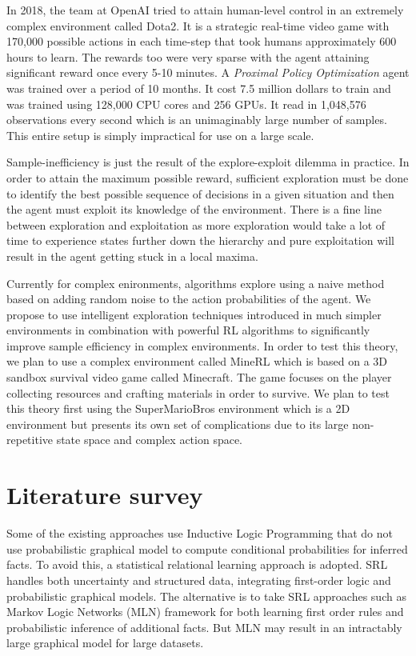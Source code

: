\documentclass[12pt,a4paper]{article}
\begin{document}
In 2018, the team at OpenAI tried to attain human-level control
in an extremely complex environment called Dota2. It is a 
strategic real-time video game with 170,000 possible actions in each
time-step that took humans approximately 600 hours to learn. The rewards 
too were very sparse with the agent attaining significant reward once 
every 5-10 minutes. A \textit{Proximal Policy Optimization}
agent was trained over a period of 10 months. It cost 7.5 million 
dollars to train and was trained using
128,000 CPU cores and 256 GPUs. It read in 1,048,576 observations 
every second which is an unimaginably large number of samples. 
This entire setup is simply impractical for use on a large scale.

Sample-inefficiency is just the result of the explore-exploit dilemma 
in practice. In order to attain the maximum possible reward, sufficient
exploration must be done to identify the best possible sequence of decisions
in a given situation and then the agent must exploit its knowledge of the environment.
There is a fine line between exploration and exploitation as more exploration
would take a lot of time to experience states further down the hierarchy and pure 
exploitation will result in the agent getting stuck in a local maxima. 

Currently for complex enironments, algorithms 
explore using a naive method based on adding random noise to the action 
probabilities of the agent. We propose to use intelligent exploration 
techniques introduced in much simpler environments in combination with 
powerful RL algorithms to significantly improve sample efficiency in 
complex environments. In order to test this theory, we plan to use a complex
environment called MineRL which is based on a 3D sandbox survival video game
called Minecraft. The game focuses on the player collecting resources and crafting materials
in order to survive. We plan to test this theory first using the SuperMarioBros 
environment which is a 2D environment but presents its own set of complications 
due to its large non-repetitive state space and complex action space.

\section{Literature survey}
Some of the existing approaches use Inductive Logic Programming that
do not use probabilistic graphical model to compute conditional
probabilities for inferred facts. To avoid this, a statistical
relational learning approach is adopted. SRL handles both uncertainty
and structured data, integrating first-order logic and probabilistic
graphical models. The alternative is to take SRL approaches such as
Markov Logic Networks (MLN) framework for both learning first order
rules and probabilistic inference of additional facts. But MLN may
result in an intractably large graphical model for large datasets.
\end{document}
